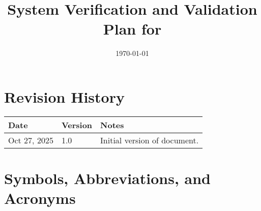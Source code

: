 \documentclass[12pt, titlepage]{article}
\begin{document}
\title{System Verification and Validation Plan for \progname{}}
\author{\authname}
\date{\today}

\maketitle


\section*{Revision History}

\begin{tabularx}{\textwidth}{p{3cm}p{2cm}X}
  \toprule {\bf Date} & {\bf Version} & {\bf Notes}\\
  \midrule
  Oct 27, 2025 & 1.0 & Initial version of document.\\
  \bottomrule
\end{tabularx}
\newpage
\tableofcontents
\listoftables
\newpage

\section{Symbols, Abbreviations, and Acronyms}
\end{document}

